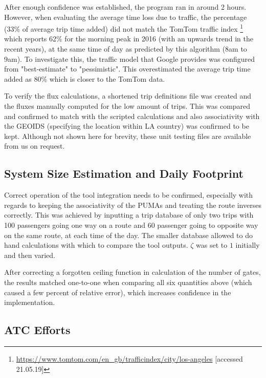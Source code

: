 After enough confidence was established, the program ran in around 2 hours. However, when evaluating the average time loss due to traffic, the percentage (33\% of average trip time added) did not match the TomTom traffic index \footnote{\url{https://www.tomtom.com/en_gb/trafficindex/city/los-angeles} [accessed 21.05.19]} which reports 62\% for the morning peak in 2016 (with an upwards trend in the recent years), at the same time of day as predicted by this algorithm (8am to 9am). To investigate this, the traffic model that Google provides was configured from "best-estimate" to "pessimistic". This overestimated the average trip time added as 80\% which is closer to the TomTom data.

To verify the flux calculations, a shortened trip definitions file was created and the fluxes manually computed for the low amount of trips. This was compared and confirmed to match with the scripted calculations and also associativity with the GEOIDS (specifying the location within LA country) was confirmed to be kept. Although not shown here for brevity, these unit testing files are available from us on request.

\subsection{System Size Estimation and Daily Footprint} \label{sec:SysSizeVerification}

Correct operation of the tool integration needs to be confirmed, especially with regards to keeping the associativity of the PUMAs and treating the route inverses correctly. This was achieved by inputting a trip database of only two trips with 100 passengers going one way on a route and 60 passenger going to opposite way on the same route, at each time of the day. The smaller database allowed to do hand calculations with which to compare the tool outputs. $\zeta$ was set to $1$ initially and then varied.

After correcting a forgotten ceiling function in calculation of the number of gates, the results matched one-to-one when comparing all six quantities above (which caused a few percent of relative error), which increases confidence in the implementation.

\subsection{ATC Efforts} \label{sec:ATCVerification}

